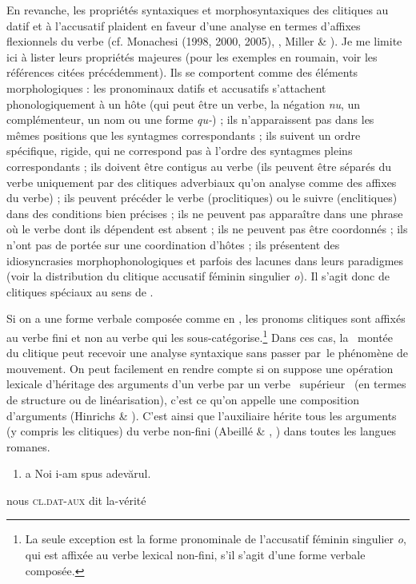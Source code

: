 En revanche, les propriétés syntaxiques et morphosyntaxiques des clitiques au datif et à l'accusatif plaident en faveur d'une analyse en termes d'affixes flexionnels du verbe (cf. Monachesi (1998, 2000, 2005), \citet{Barbu1999}, Miller \& \citet{Monachesi2003}). Je me limite ici à lister leurs propriétés majeures (pour les exemples en roumain, voir les références citées précédemment). Ils se comportent comme des éléments morphologiques : les pronominaux datifs et accusatifs s'attachent phonologiquement à un hôte (qui peut être un verbe, la négation \textit{nu}, un complémenteur, un nom ou une forme \textit{qu-}) ; ils n'apparaissent pas dans les mêmes positions que les syntagmes correspondants ; ils suivent un ordre spécifique, rigide, qui ne correspond pas à l'ordre des syntagmes pleins correspondants ; ils doivent être contigus au verbe (ils peuvent être séparés du verbe uniquement par des clitiques adverbiaux qu'on analyse comme des affixes du verbe) ; ils peuvent précéder le verbe (proclitiques) ou le suivre (enclitiques) dans des conditions bien précises ; ils ne peuvent pas apparaître dans une phrase où le verbe dont ils dépendent est absent ; ils ne peuvent pas être coordonnés ; ils n'ont pas de portée sur une coordination d'hôtes ; ils présentent des idiosyncrasies morphophonologiques et parfois des lacunes dans leurs paradigmes (voir la distribution du clitique accusatif féminin singulier \textit{o}). Il s'agit donc de clitiques spéciaux au sens de \citet{Zwicky1977}. 

Si on a une forme verbale composée comme en , les pronoms clitiques sont affixés au verbe fini et non au verbe qui les sous-catégorise.\footnote{La seule exception est la forme pronominale de l'accusatif féminin singulier \textit{o}, qui est affixée au verbe lexical non-fini, s'il s'agit d'une forme verbale composée.} Dans ces cas, la {\guillemotleft}~montée~{\guillemotright} du clitique peut recevoir une analyse syntaxique sans passer par~le phénomène de mouvement. On peut facilement en rendre compte si on suppose une opération lexicale d'héritage des arguments d'un verbe par un verbe {\guillemotleft}~supérieur~{\guillemotright} (en termes de structure ou de linéarisation), c'est ce qu'on appelle une composition d'arguments (Hinrichs \& \citet{Nakazawa1994}). C'est ainsi que l'auxiliaire hérite tous les arguments (y compris les clitiques) du verbe non-fini (Abeillé \& \citet{Godard2003}, \citet{Monachesi2005}) dans toutes les langues romanes.


\begin{enumerate}
\item \label{bkm:Ref299293811}a  Noi  i-am  spus  adevărul.


\end{enumerate}
nous  \textsc{cl.dat-aux}  dit  la-vérité

